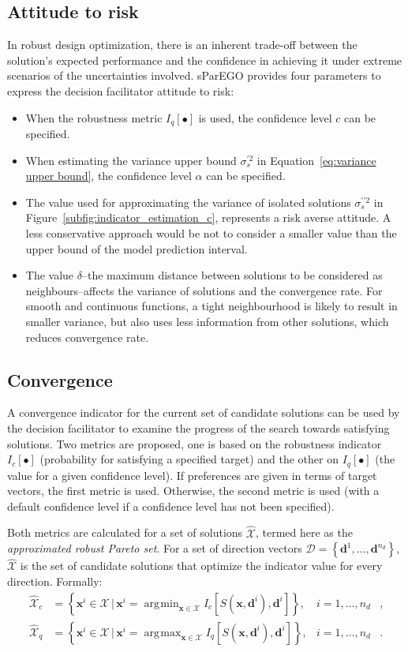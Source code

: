 \documentclass[a4paper]{article}
\newcommand{\brr}[1]{{\left({#1}\right)}} %
\newcommand{\brf}[1]{\left\lbrace{#1}\right\rbrace} %
\newcommand{\Iq}[1]{\ensuremath{I_q\!\left[{#1}\right]}} %
\newcommand{\Ic}[1]{\ensuremath{I_c\!\left[{#1}\right]}} %
\newcommand{\vx}{\ensuremath{\mathbf{x}}} %
\newcommand{\vd}{\ensuremath{\mathbf{d}}} %
\newcommand{\DSet}{\ensuremath{\mathcal{D}}} %
\newcommand{\XSet}{\ensuremath{\mathcal{X}}} %
\DeclareMathOperator*{\argmin}{\arg\!\min}
\DeclareMathOperator*{\argmax}{\arg\!\max}
\begin{document}
\subsection{Attitude to risk}
\label{subsec:risk}
In robust design optimization, there is an inherent trade-off between the solution's expected performance and the confidence in achieving it under extreme scenarios of the uncertainties involved. sParEGO provides four parameters to express the decision facilitator attitude to risk:
\begin{itemize}
	\item When the robustness metric $\Iq{\bullet}$ is used, the confidence level $c$ can be specified.
	\item When estimating the variance upper bound $\sigma^{\prime 2}_s$  in Equation~\eqref{eq:variance upper bound}, the confidence level $\alpha$ can be specified.
	\item The value used for approximating the variance of isolated solutions $\sigma^{\prime\prime 2}_s$ in Figure~\ref{subfig:indicator_estimation_c}, represents a risk averse attitude. A less conservative approach would be not to consider a smaller value than the upper bound of the model prediction interval.
	\item The value $\delta$--the maximum distance between solutions to be considered as neighbours--affects the variance of solutions and the convergence rate.
		For smooth and continuous functions, a tight neighbourhood is likely to result in smaller variance, but also uses less information from other solutions, which reduces convergence rate.
\end{itemize}

\subsection{Convergence}
\label{subsec:convergence}
A convergence indicator for the current set of candidate solutions can be used by the decision facilitator to examine the progress of the search towards satisfying solutions. Two metrics are proposed, one is based on the robustness indicator $\Ic{\bullet}$ (probability for satisfying a specified target) and the other on $\Iq{\bullet}$ (the value for a given confidence level). If preferences are given in terms of target vectors, the first metric is used. Otherwise, the second metric is used (with a default confidence level if a confidence level has not been specified).

Both metrics are calculated for a set of solutions $\hat{\XSet}$, termed here as the \textit{approximated robust Pareto set}. For a set of direction vectors $\DSet = \brf{\vd^1,\ldots,\vd^{n_d}}$, $\hat{\XSet}$ is the set of candidate solutions that optimize the indicator value for every direction. Formally:
\begin{align}
	\label{eq:Xc} \hat{\XSet}_c &= \brf{\vx^i\in \XSet \,\vert\, \vx^i = \argmin_{\vx\in\XSet} \Ic{S\brr{\vx,\vd^i},\vd^i} }, &i=1,\ldots,n_d&,\\ 
	\label{eq:Xq} \hat{\XSet}_q &= \brf{\vx^i\in \XSet \,\vert\, \vx^i = \argmax_{\vx\in\XSet} \Iq{S\brr{\vx,\vd^i},\vd^i} }, &i=1,\ldots,n_d&.
\end{align}
\end{document}
